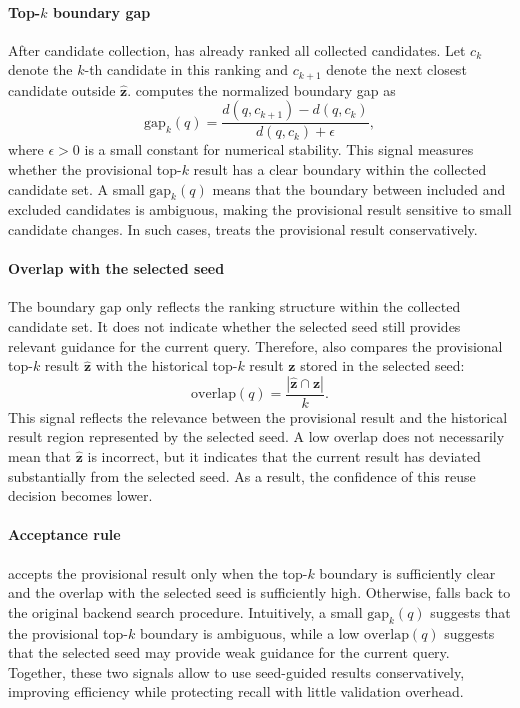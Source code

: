 \paragraph{Top-$k$ boundary gap}
After candidate collection, \system has already ranked all collected candidates.
Let $c_k$ denote the $k$-th candidate in this ranking and $c_{k+1}$ denote the next closest candidate outside $\hat{\mathbf{z}}$.
\system computes the normalized boundary gap as
\begin{equation}
\mathrm{gap}_k(q)=
\frac{d(q,c_{k+1})-d(q,c_k)}
{d(q,c_k)+\epsilon},
\end{equation}
where $\epsilon>0$ is a small constant for numerical stability.
This signal measures whether the provisional top-$k$ result has a clear boundary within the collected candidate set.
A small $\mathrm{gap}_k(q)$ means that the boundary between included and excluded candidates is ambiguous, making the provisional result sensitive to small candidate changes.
In such cases, \system treats the provisional result conservatively.

\paragraph{Overlap with the selected seed}
The boundary gap only reflects the ranking structure within the collected candidate set.
It does not indicate whether the selected seed still provides relevant guidance for the current query.
Therefore, \system also compares the provisional top-$k$ result $\hat{\mathbf{z}}$ with the historical top-$k$ result $\mathbf{z}$ stored in the selected seed:
\begin{equation}
\mathrm{overlap}(q)=
\frac{|\hat{\mathbf{z}}\cap \mathbf{z}|}{k}.
\end{equation}
This signal reflects the relevance between the provisional result and the historical result region represented by the selected seed.
A low overlap does not necessarily mean that $\hat{\mathbf{z}}$ is incorrect, but it indicates that the current result has deviated substantially from the selected seed.
As a result, the confidence of this reuse decision becomes lower.


\paragraph{Acceptance rule}
\system accepts the provisional result only when the top-$k$ boundary is sufficiently clear and the overlap with the selected seed is sufficiently high.
Otherwise, \system falls back to the original backend search procedure.
Intuitively, a small $\mathrm{gap}_k(q)$ suggests that the provisional top-$k$ boundary is ambiguous, while a low $\mathrm{overlap}(q)$ suggests that the selected seed may provide weak guidance for the current query.
Together, these two signals allow \system to use seed-guided results conservatively, improving efficiency while protecting recall with little validation overhead.





